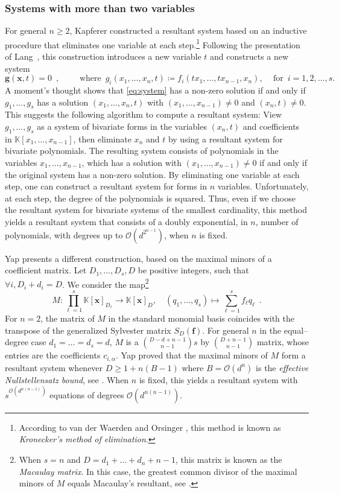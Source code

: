 \documentclass[11pt,a4paper]{article}
\numberwithin{equation}{section}
\newcommand{\KK}{\mathbb{K}}
\newcommand{\cO}{\mathcal{O}}
\newcommand{\xx}{\ensuremath{\boldsymbol{x}}}
\newcommand{\ff}{\ensuremath{\boldsymbol{f}}}
\begin{document}
\subsubsection{Systems with more than two variables}
For general $n\geq 2$, Kapferer \cite{Kapferer-29} constructed a resultant system based on an inductive procedure that eliminates one variable at each step.\footnote{According to van der Waerden \cite{vdWaerden-40} and Orsinger \cite{Orsinger-51}, this method is known as \emph{Kronecker's method of elimination}. }
Following the presentation of Lang~\cite{Lang-12}, 
this construction introduces a new variable $t$ and constructs a new system 
\[
    \mathbf{g}(\xx, t) = 0 \enspace, \qquad
    \text{ where }\,
    g_i(x_1,\dots,x_n,t) \coloneqq f_i(t x_1, \dots, t x_{n-1}, x_n), \quad \, \text{for }\, i =1,2,\dots,s.
\] A moment's thought shows that \eqref{eq:system} has a non-zero solution if and only if $g_1,\dots,g_s$ has a solution $(x_1,\dots,x_n,t)$ with $(x_1,\dots,x_{n-1})\neq 0$ and $(x_n,t)\neq 0$.
This suggests the following algorithm to compute a resultant system:
View $g_1,\dots,g_s$ as a system of bivariate forms in the variables $(x_n,t)$ and coefficients in $\KK[x_1,\dots,x_{n-1}]$, then eliminate $x_n$ and $t$ by using a resultant system for bivariate polynomials.
The resulting system consists of polynomials in the variables $x_1,\dots,x_{n-1}$, which has a solution with $(x_1,\dots,x_{n-1})\neq 0$ if and only if the original system has a non-zero solution.
By eliminating one variable at each step, one can construct a resultant system for forms in $n$ variables.
Unfortunately, at each step, the degree of the polynomials is squared.
Thus, even if we choose the resultant system for bivariate systems of the smallest cardinality, this method yields a resultant system that consists of a doubly exponential, in $n$, number of polynomials, with degrees up to $\cO(d^{2^{n-1}})$, when $n$ is fixed. 

Yap \cite{Yap-99} presents a different construction,
based on the maximal minors of a coefficient matrix.
Let $D_1,\dots,D_s,D$ be positive integers, 
such that $\forall i, D_i + d_i =D$.
We consider the map\footnote{When $s=n$ and $D=d_1+\dots+d_n+n-1$, this matrix is known as the \emph{Macaulay matrix}. 
In this case, the greatest common divisor of the maximal minors of $M$ equals Macaulay's resultant, see \cite[\S 1]{Macaulay-16}.} \[
M : \prod_{\ell=1}^s \KK[\xx]_{D_{\ell}} \rightarrow \KK[\xx]_D, \quad (q_1,\dots,q_s) \mapsto \sum_{\ell=1}^s f_\ell q_\ell \enspace.
\] For $n=2$, the matrix of $M$ in the standard monomial basis coincides with the transpose of the generalized Sylvester matrix $S_D(\ff)$.
For general $n$ in the equal--degree case $d_1=\dots=d_s=d$, $M$ is a $\binom{D-d+n-1}{n-1}s$ by $\binom{D+n-1}{n-1}$ matrix, whose entries are the coefficients $c_{i,\alpha}$.
Yap proved that the maximal minors of $M$ form a resultant system whenever $D\geq 1+n(B-1)$ where $B=\cO(d^n)$ is the \emph{effective Nullstellensatz bound}, see \cite[Lecture XI, Theorem 13]{Yap-99}. 
When $n$ is fixed, this yields a resultant system with $s^{\cO(d^{n(n-1)})}$ equations of degrees $\cO(d^{n(n-1)})$.
\end{document}
